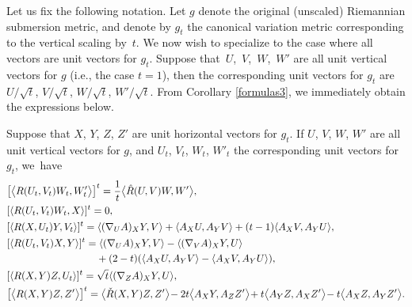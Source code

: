 Let us fix the following notation. Let $g$ denote the original (unscaled) Riemannian submersion metric, and denote by $g_t$ the canonical variation metric corresponding to the vertical scaling by~$t$. We now wish to specialize to the case where all vectors are unit vectors for $g_t$. Suppose that~$U$,~$V$,~$W$,~$W'$ are all unit vertical vectors for $g$ (i.e., the case $t=1$), then the corresponding unit vectors for $g_t$ are $U/\sqrt t$, $V/\sqrt t$, $W/\sqrt t$, $W'/\sqrt t$. From Corollary \ref{formulas3}, we immediately obtain the expressions below.

\begin{Corollary}\label{formulas4}
	Suppose that $X$, $Y$, $Z$, $Z'$ are unit horizontal vectors for $g_t$. If $U$, $V$, $W$, $W'$ are all unit vertical vectors for $g$, and $U_t$, $V_t$, $W_t$, $W'_t$ the corresponding unit vectors for $g_t$, we~have
	\begin{align*}
		&\bigl[\bigl\langle R(U_t,V_t)W_t,W'_t \bigr\rangle\bigr]^t =\frac{1}{t}\bigl\langle \hat{R}(U,V)W,W' \bigr\rangle, \\
		&[\langle R(U_t,V_t)W_t,X\rangle]^t =0, \\
		&[\langle R(X,U_t)Y,V_t \rangle]^t =\langle (\nabla_U A)_X Y,V \rangle +\langle A_X U, A_Y V\rangle+(t-1)\langle A_XV,A_YU\rangle,\\
		&[\langle R(U_t,V_t)X,Y \rangle]^t =\langle (\nabla_U A)_X Y,V \rangle-\langle (\nabla_V A)_X Y,U\rangle\\
		&\hphantom{[\langle R(U_t,V_t)X,Y \rangle]^t =}{} +(2-t)(\langle A_XU,A_YV\rangle-\langle A_XV,A_YU\rangle),\\
		&[\langle R(X,Y)Z,U_t \rangle]^t = \sqrt{t}\langle (\nabla_ZA)_X Y,U \rangle, \\
		&\bigl[\bigl\langle R(X,Y)Z,Z' \bigr\rangle\bigr]^t =\bigl\langle \check{R}(X,Y)Z,Z' \bigr\rangle\!-2t\bigl\langle A_XY,A_ZZ' \bigr\rangle\! + t\bigl\langle A_Y Z,A_X Z'\bigr\rangle\!-t\bigl\langle A_X Z, A_Y Z'\bigr\rangle.
	\end{align*}
\end{Corollary}

